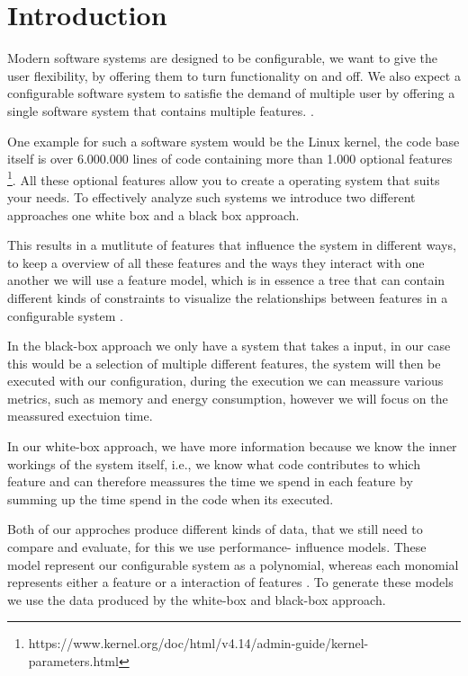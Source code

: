 \chapter{Introduction}\label{ch:introduction}

Modern software systems are designed to be configurable, we want to give the user flexibility, by offering them to turn functionality on 
and off. 
We also expect a configurable software system to satisfie the demand of multiple user by offering a single software system that 
contains multiple features. \cite{Feature-Oriented-Software-Product-Lines}. 

One example for such a software system would be the Linux kernel, the code base itself is over 6.000.000 lines of code containing more than 1.000 optional features 
\footnote{https://www.kernel.org/doc/html/v4.14/admin-guide/kernel-parameters.html}. 
All these optional features allow you to create a operating system that suits your needs. To effectively analyze such systems we introduce two different
approaches one white box and a black box approach.

This results in a mutlitute of features that influence the system in different ways, to keep a overview of all these features and the ways
they interact with one another we will use a feature model, which is in essence a tree that can contain different kinds of constraints
to visualize the relationships between features in a configurable system \cite{KangFeatureOrientedDomain1990}.

In the black-box approach we only have a system that takes a input, in our case this would be a selection of multiple different features, 
the system will then be executed with our configuration, during the execution we can meassure various metrics, such as memory and energy
consumption, however we will focus on the meassured exectuion time.

In our white-box approach, we have more information because we know the inner workings of the
system itself, i.e., we know what code contributes to which feature and can therefore meassures the time we spend in each feature by summing
up the time spend in the code when its executed.

Both of our approches produce different kinds of data, that we still need to compare and evaluate, for this we use performance-
influence models. These model represent our configurable system as a polynomial, whereas each monomial represents either a feature or a 
interaction of features \cite{DBLP:journals/concurrency/GrebhahnRSGA17}. To generate these models we use the data produced by the white-box and black-box approach.

